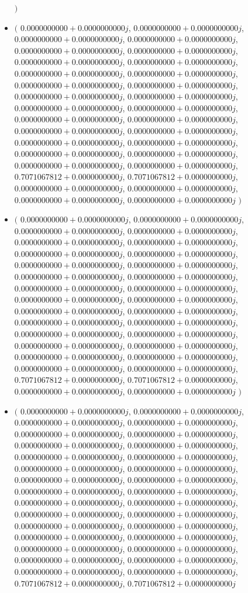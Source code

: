 \documentclass[14pt,a4paper]{article}
\begin{document}
\begin{itemize}
$\big)$
\item
$\big($
$0.0000000000+0.0000000000j$, $0.0000000000+0.0000000000j$, $0.0000000000+0.0000000000j$, $0.0000000000+0.0000000000j$, $0.0000000000+0.0000000000j$, $0.0000000000+0.0000000000j$, $0.0000000000+0.0000000000j$, $0.0000000000+0.0000000000j$, $0.0000000000+0.0000000000j$, $0.0000000000+0.0000000000j$, $0.0000000000+0.0000000000j$, $0.0000000000+0.0000000000j$, $0.0000000000+0.0000000000j$, $0.0000000000+0.0000000000j$, $0.0000000000+0.0000000000j$, $0.0000000000+0.0000000000j$, $0.0000000000+0.0000000000j$, $0.0000000000+0.0000000000j$, $0.0000000000+0.0000000000j$, $0.0000000000+0.0000000000j$, $0.0000000000+0.0000000000j$, $0.0000000000+0.0000000000j$, $0.0000000000+0.0000000000j$, $0.0000000000+0.0000000000j$, $0.0000000000+0.0000000000j$, $0.0000000000+0.0000000000j$, $0.7071067812+0.0000000000j$, $0.7071067812+0.0000000000j$, $0.0000000000+0.0000000000j$, $0.0000000000+0.0000000000j$, $0.0000000000+0.0000000000j$, $0.0000000000+0.0000000000j$
$\big)$
\item
$\big($
$0.0000000000+0.0000000000j$, $0.0000000000+0.0000000000j$, $0.0000000000+0.0000000000j$, $0.0000000000+0.0000000000j$, $0.0000000000+0.0000000000j$, $0.0000000000+0.0000000000j$, $0.0000000000+0.0000000000j$, $0.0000000000+0.0000000000j$, $0.0000000000+0.0000000000j$, $0.0000000000+0.0000000000j$, $0.0000000000+0.0000000000j$, $0.0000000000+0.0000000000j$, $0.0000000000+0.0000000000j$, $0.0000000000+0.0000000000j$, $0.0000000000+0.0000000000j$, $0.0000000000+0.0000000000j$, $0.0000000000+0.0000000000j$, $0.0000000000+0.0000000000j$, $0.0000000000+0.0000000000j$, $0.0000000000+0.0000000000j$, $0.0000000000+0.0000000000j$, $0.0000000000+0.0000000000j$, $0.0000000000+0.0000000000j$, $0.0000000000+0.0000000000j$, $0.0000000000+0.0000000000j$, $0.0000000000+0.0000000000j$, $0.0000000000+0.0000000000j$, $0.0000000000+0.0000000000j$, $0.7071067812+0.0000000000j$, $0.7071067812+0.0000000000j$, $0.0000000000+0.0000000000j$, $0.0000000000+0.0000000000j$
$\big)$
\item
$\big($
$0.0000000000+0.0000000000j$, $0.0000000000+0.0000000000j$, $0.0000000000+0.0000000000j$, $0.0000000000+0.0000000000j$, $0.0000000000+0.0000000000j$, $0.0000000000+0.0000000000j$, $0.0000000000+0.0000000000j$, $0.0000000000+0.0000000000j$, $0.0000000000+0.0000000000j$, $0.0000000000+0.0000000000j$, $0.0000000000+0.0000000000j$, $0.0000000000+0.0000000000j$, $0.0000000000+0.0000000000j$, $0.0000000000+0.0000000000j$, $0.0000000000+0.0000000000j$, $0.0000000000+0.0000000000j$, $0.0000000000+0.0000000000j$, $0.0000000000+0.0000000000j$, $0.0000000000+0.0000000000j$, $0.0000000000+0.0000000000j$, $0.0000000000+0.0000000000j$, $0.0000000000+0.0000000000j$, $0.0000000000+0.0000000000j$, $0.0000000000+0.0000000000j$, $0.0000000000+0.0000000000j$, $0.0000000000+0.0000000000j$, $0.0000000000+0.0000000000j$, $0.0000000000+0.0000000000j$, $0.0000000000+0.0000000000j$, $0.0000000000+0.0000000000j$, $0.7071067812+0.0000000000j$, $0.7071067812+0.0000000000j$

\end{itemize}
\end{document}
